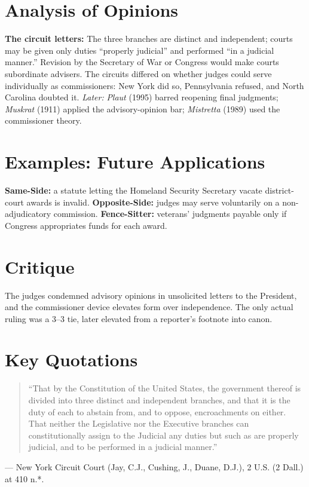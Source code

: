 \documentclass[12pt]{article}
\begin{document}
\section{Analysis of Opinions}
\textbf{The circuit letters:} The three branches are distinct and independent; courts may be given only duties ``properly judicial'' and performed ``in a judicial manner.'' Revision by the Secretary of War or Congress would make courts subordinate advisers. The circuits differed on whether judges could serve individually as commissioners: New York did so, Pennsylvania refused, and North Carolina doubted it. \emph{Later:} \textit{Plaut} (1995) barred reopening final judgments; \textit{Muskrat} (1911) applied the advisory-opinion bar; \textit{Mistretta} (1989) used the commissioner theory.

\section{Examples: Future Applications}
\textbf{Same-Side:} a statute letting the Homeland Security Secretary vacate district-court awards is invalid. \textbf{Opposite-Side:} judges may serve voluntarily on a non-adjudicatory commission. \textbf{Fence-Sitter:} veterans' judgments payable only if Congress appropriates funds for each award.

\section{Critique}
The judges condemned advisory opinions in unsolicited letters to the President, and the commissioner device elevates form over independence. The only actual ruling was a 3--3 tie, later elevated from a reporter's footnote into canon.

\section{Key Quotations}
\begin{quote}
``That by the Constitution of the United States, the government thereof is divided into three distinct and independent branches, and that it is the duty of each to abstain from, and to oppose, encroachments on either. That neither the Legislative nor the Executive branches can constitutionally assign to the Judicial any duties but such as are properly judicial, and to be performed in a judicial manner.''
\end{quote}
\noindent --- New York Circuit Court (Jay, C.J., Cushing, J., Duane, D.J.), 2 U.S. (2 Dall.) at 410 n.*.
\end{document}
